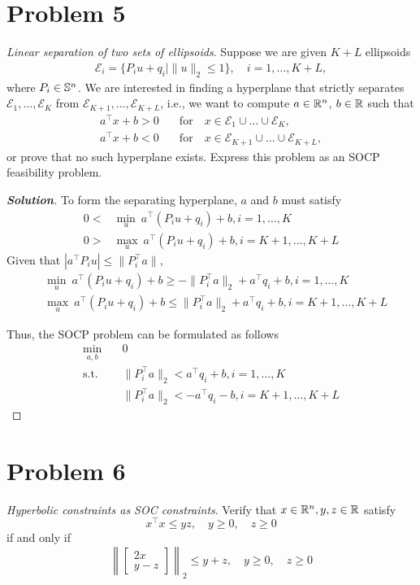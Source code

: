 \documentclass[11pt]{article}
\newenvironment{solution}
  {\renewcommand\qedsymbol{$\square$}\begin{proof}[\textbf{Solution}]}
  {\end{proof}}
\newcommand{\T}{^\top}
\begin{document}
\clearpage
\section*{Problem 5}
\textit{Linear separation of two sets of ellipsoids}. Suppose we are given $K + L$ ellipsoids
\begin{align*}
\mathcal{E}_i = \{P_iu + q_i \mid \|u\|_2 \leq 1\}, \quad i = 1, \ldots, K + L,
\end{align*}
where $P_i \in {{\mathbb{S}}}^n$. 
We are interested in finding a hyperplane that strictly separates 
$\mathcal{E}_1, \ldots, \mathcal{E}_K$ from $\mathcal{E}_{K+1}, \ldots, \mathcal{E}_{K+L}$, i.e., 
we want to compute $a \in {{\mathbb{R}}}^n$, $b \in {{\mathbb{R}}}$ such that
\begin{align*}
a\T x + b > 0 \quad& \text{for} \quad x \in \mathcal{E}_1 \cup \ldots \cup \mathcal{E}_K, \\
a\T x + b < 0 \quad& \text{for} \quad x \in \mathcal{E}_{K+1} \cup \ldots \cup \mathcal{E}_{K+L},
\end{align*}
or prove that no such hyperplane exists. 
Express this problem as an SOCP feasibility problem.

\begin{solution}
  To form the separating hyperplane, $a$ and $b$ must satisfy
  \begin{align*}
    0 < &\min_{u}\  a\T(P_i u + q_i) + b, i = 1, \dots, K\\
    0 > &\max_{u}\  a\T(P_i u + q_i) + b, i = K+1, \dots, K+L
  \end{align*}
  Given that $|a\T P_i u| \leq \|P_i\T a\|$, 
  \begin{align*}
    & \min_{u}\  a\T(P_i u + q_i) + b \geq -\|P_i\T a\|_2 + a\T q_i + b, i = 1, \dots, K\\
    & \max_{u}\  a\T(P_i u + q_i) + b \leq \|P_i\T a\|_2 + a\T q_i + b, i = K+1, \dots, K+L
  \end{align*}  
  
  Thus, the SOCP problem can be formulated as follows
  \begin{align*}
    \min_{a, b} \quad & 0\\
    \text{s.t.} \quad 
    & \|P_i\T a\|_2 <   a\T q_i + b, i = 1, \dots, K\\
    & \|P_i\T a\|_2 < - a\T q_i - b, i = K+1, \dots, K+L
  \end{align*}
\end{solution}

\clearpage
\section*{Problem 6}
\textit{Hyperbolic constraints as SOC constraints}. Verify that $x\in{{\mathbb{R}}}^n,y,z\in{{\mathbb{R}}}$ satisfy
\[
x\T x\leq yz, \quad y\geq 0, \quad z\geq 0
\]
if and only if
\[
\left\|\begin{bmatrix}
  2x\\ y-z
\end{bmatrix}\right\|_2 
\leq y+z,\quad y\geq 0,\quad z\geq 0
\]
\end{document}
